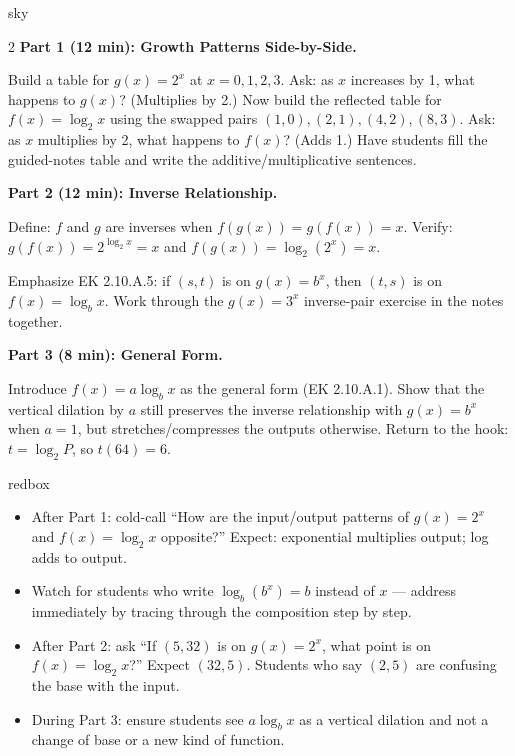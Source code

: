 \documentclass[10pt]{article}
\begin{document}
\begin{skillbox}[Lesson]{sky}
\begin{multicols}{2}
\textbf{Part 1 (12 min): Growth Patterns Side-by-Side.}

Build a table for $g(x) = 2^x$ at $x = 0,1,2,3$. Ask: as $x$ increases by 1, what happens
to $g(x)$? (Multiplies by 2.) Now build the reflected table for $f(x) = \log_2 x$ using the
swapped pairs $(1,0),(2,1),(4,2),(8,3)$. Ask: as $x$ multiplies by 2, what happens to $f(x)$?
(Adds 1.) Have students fill the guided-notes table and write the additive/multiplicative
sentences.

\columnbreak

\textbf{Part 2 (12 min): Inverse Relationship.}

Define: $f$ and $g$ are inverses when $f(g(x)) = g(f(x)) = x$. Verify:
$g(f(x)) = 2^{\log_2 x} = x$ and $f(g(x)) = \log_2(2^x) = x$.

Emphasize EK 2.10.A.5: if $(s,t)$ is on $g(x) = b^x$, then $(t,s)$ is on $f(x) = \log_b x$.
Work through the $g(x) = 3^x$ inverse-pair exercise in the notes together.

\textbf{Part 3 (8 min): General Form.}

Introduce $f(x) = a\log_b x$ as the general form (EK 2.10.A.1). Show that the vertical
dilation by $a$ still preserves the inverse relationship with $g(x) = b^x$ when $a = 1$, but
stretches/compresses the outputs otherwise. Return to the hook: $t = \log_2 P$, so $t(64) = 6$.
\end{multicols}
\end{skillbox}

\begin{skillbox}{redbox}
\begin{itemize}[leftmargin=1.2em,itemsep=2pt,topsep=0pt]
  \item After Part 1: cold-call ``How are the input/output patterns of $g(x)=2^x$ and
        $f(x)=\log_2 x$ opposite?'' Expect: exponential multiplies output; log adds to output.
  \item Watch for students who write $\log_b(b^x) = b$ instead of $x$ --- address immediately
        by tracing through the composition step by step.
  \item After Part 2: ask ``If $(5, 32)$ is on $g(x) = 2^x$, what point is on $f(x) = \log_2 x$?''
        Expect $(32, 5)$. Students who say $(2,5)$ are confusing the base with the input.
  \item During Part 3: ensure students see $a\log_b x$ as a vertical dilation and not a change
        of base or a new kind of function.
\end{itemize}
\end{skillbox}
\end{document}
